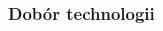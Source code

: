 \documentclass[aspectratio=169]{beamer}
\begin{document}
\begin{frame} %
    \frametitle{Dobór technologii} %
    
    \begin{columns}
        \begin{column}{0.33\textwidth}
            \begin{figure}
                \centering
            \end{figure}
            \begin{figure}
            \centering
            \end{figure}
            \begin{figure}
            \centering

\end{figure}
\end{column}
\end{columns}
\end{frame}
\end{document}

